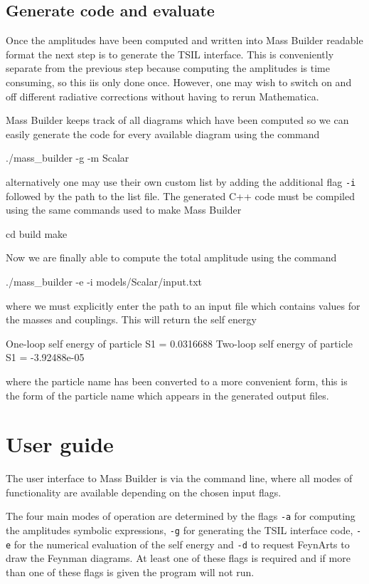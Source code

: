 \subsection{Generate code and evaluate}

Once the amplitudes have been computed and written into Mass Builder readable format the next step is to generate the TSIL interface.  This is conveniently separate from the previous step because computing the amplitudes is time consuming, so this iis only done once.  However, one may wish to switch on and off different radiative corrections without having to rerun Mathematica.

Mass Builder keeps track of all diagrams which have been computed so we can easily generate the code for every available diagram using the command
\begin{lstterm}
./mass_builder -g -m Scalar
\end{lstterm}
alternatively one may use their own custom list by adding the additional flag \lstinline{-i} followed by the path to the list file.  The generated C++ code must be compiled using the same commands used to make Mass Builder
\begin{lstterm}
cd build
make
\end{lstterm}

Now we are finally able to compute the total amplitude using the command
\begin{lstterm}
./mass_builder -e -i models/Scalar/input.txt
\end{lstterm}
where we must explicitly enter the path to an input file which contains values for the masses and couplings.  This will return the self energy
\begin{lstterm}
One-loop self energy of particle S1 = 0.0316688
Two-loop self energy of particle S1 = -3.92488e-05
\end{lstterm}
where the particle name has been converted to a more convenient form, this is the form of the particle name which appears in the generated output files.

\section{User guide}\label{sec:user_guide}

The user interface to Mass Builder is via the command line, where all modes of functionality are available depending on the chosen input flags.

The four main modes of operation are determined by the flags \lstinline{-a} for computing the amplitudes symbolic expressions, \lstinline{-g} for generating the TSIL interface code, \lstinline{-e} for the numerical evaluation of the self energy and \lstinline{-d} to request FeynArts to draw the Feynman diagrams.  At least one of these flags is required and if more than one of these flags is given the program will not run.

